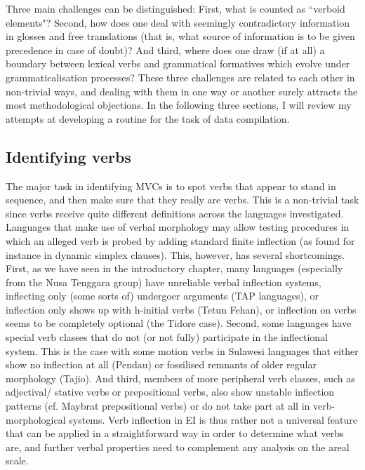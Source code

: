 Three main challenges can be distinguished: First, what is counted as ``verboid elements"? Second, how does one deal with seemingly contradictory information in glosses and free translations (that is, what source of information is to be given precedence in case of doubt)? And third, where does one draw (if at all) a boundary between lexical verbs and grammatical formatives which evolve under grammaticalisation processes? These three challenges are related to each other in non-trivial ways, and dealing with them in one way or another surely attracts the most methodological objections. In the following three sections, I will review my attempts at developing a routine for the task of data compilation.

\subsection{Identifying verbs}\label{sec:identifyingverbs}

The major task in identifying MVCs is to spot verbs that appear to stand in sequence, and then make sure that they really are verbs. This is a non-trivial task since verbs receive quite different definitions across the languages investigated. Languages that make use of verbal morphology may allow testing procedures in which an alleged verb is probed by adding standard finite inflection (as found for instance in dynamic simplex clauses). This, however, has several shortcomings. First, as we have seen in the introductory chapter, many languages (especially from the Nusa Tenggara group) have unreliable verbal inflection systems, inflecting only (some sorts of) undergoer arguments (TAP languages), or inflection only shows up with h-initial verbs (Tetun Fehan), or inflection on verbs seems to be completely optional (the Tidore case). Second, some languages have special verb classes that do not (or not fully) participate in the inflectional system. This is the case with some motion verbs in Sulawesi languages that either show no inflection at all (Pendau) or fossilised remnants of older regular morphology (Tajio). And third, members of more peripheral verb classes, such as adjectival/ stative verbs or prepositional verbs, also show unstable inflection patterns (cf. Maybrat prepositional verbs) or do not take part at all in verb-morphological systems. Verb inflection in EI is thus rather not a universal feature that can be applied in a straightforward way in order to determine what verbs are, and further verbal properties need to complement any analysis on the areal scale.

